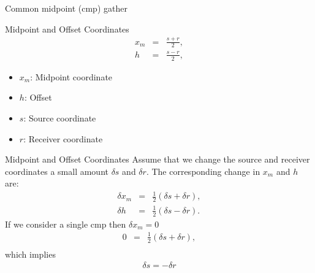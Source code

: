 \documentclass[xcolor=dvipsnames,notes]{beamer}
\begin{document}
\begin{frame}{Common midpoint (cmp) gather}
\begin{figure}
\label{fig:1-cmp}
\end{figure}
\end{frame}
%
\begin{frame}{Midpoint and Offset Coordinates}
\begin{eqnarray}
x_m & = & \frac{s+r}{2} ,\\
h   & = &  \frac{s-r}{2},
\label{eq:cmpcoord}
\end{eqnarray}
\begin{itemize}
  \item $x_m$: Midpoint coordinate
  \item $h$: Offset
  \item $s$: Source coordinate
  \item $r$: Receiver coordinate
\end{itemize}
\end{frame}
\begin{frame}{Midpoint and Offset Coordinates}
Assume that we change the source and
receiver coordinates a small amount $\delta s$ and $\delta r$.
The corresponding change in $x_m$ and $h$ are:
\begin{eqnarray}
\delta x_m & = & \frac{1}{2}\left(\delta s + \delta r\right) ,
                                              \label{eq:deltasrA}\\
\delta h   & = &  \frac{1}{2}\left(\delta s - \delta r\right).
                                              \label{eq:deltasrB}
\label{eq:deltasr}
\end{eqnarray}
If we consider a single cmp then $\delta x_m=0$
\begin{eqnarray}
0 & = & \frac{1}{2}\left(\delta s + \delta r\right) ,\\
\label{eq:deltasr2}
\end{eqnarray}
which implies
\begin{eqnarray}
\delta s = -\delta r
\label{eq:deltasr3}
\end{eqnarray}
\end{frame}
\end{document}
